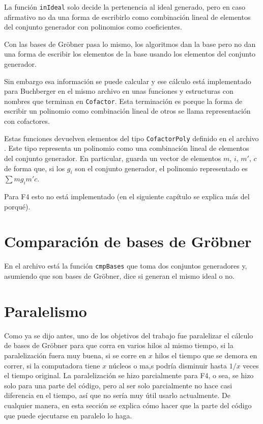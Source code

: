 \documentclass[12pt]{report}
\theoremstyle{customstyle}
\theoremstyle{factstyle}
\begin{document}
La función \texttt{inIdeal} solo decide la pertenencia al ideal generado, pero en caso afirmativo no da una forma de escribirlo como combinación lineal de elementos del conjunto generador con polinomios como coeficientes.

Con las bases de Gröbner pasa lo mismo, los algoritmos dan la base pero no dan una forma de escribir los elementos de la base usando los elementos del conjunto generador.

Sin embargo esa información se puede calcular y ese cálculo está implementado para Buchberger en el mismo archivo  en unas funciones y estructuras con nombres que terminan en \texttt{Cofactor}. Esta terminación es porque la forma de escribir un polinomio como combinación lineal de otros se llama representación con cofactores.

Estas funciones devuelven elementos del tipo \texttt{CofactorPoly} definido en el archivo . Este tipo representa un polinomio como una combinación lineal de elementos del conjunto generador. En particular, guarda un vector de elementos $m$, $i$, $m'$, $c$ de forma que, si los $g_i$ son el conjunto generador, el polinomio representado es $∑ m g_i m' c$.

Para F4 esto no está implementado (en el siguiente capítulo se explica más del porqué).


\section{Comparación de bases de Gröbner}\label{section:Comparación de bases de Gröbner (libreria)}

En el archivo  está la función \texttt{cmpBases} que toma dos conjuntos generadores y, asumiendo que son bases de Gröbner, dice si generan el mismo ideal o no.

\section{Paralelismo} %

Como ya se dijo antes, uno de los objetivos del trabajo fue paralelizar el cálculo de bases de Gröbner para que corra en varios hilos al mismo tiempo, si la paralelización fuera muy buena, si se corre en $x$ hilos el tiempo que se demora en correr, si la computadora tiene $x$ núcleos o ma,s podría disminuir hasta $1/x$ veces el tiempo original. La paralelización se hizo parcialmente para F4, o sea, se hizo solo para una parte del código, pero al ser solo parcialmente no hace casi diferencia en el tiempo, así que no sería muy útil usarlo actualmente. De cualquier manera, en esta sección se explica cómo hacer que la parte del código que puede ejecutarse en paralelo lo haga.
\end{document}
